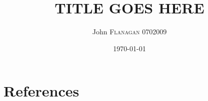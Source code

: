\documentclass[pdftex,12pt,a4paper]{report}
\author{John \textsc{Flanagan} 0702009 }
\title{TITLE GOES HERE}
\date{\today}
\begin{document}

\pagebreak



\pagebreak


\pagebreak



\pagebreak



\pagebreak



\pagebreak


\pagebreak



\pagebreak



\pagebreak


\pagebreak

\pagebreak

\chapter{References}


\end{document}
